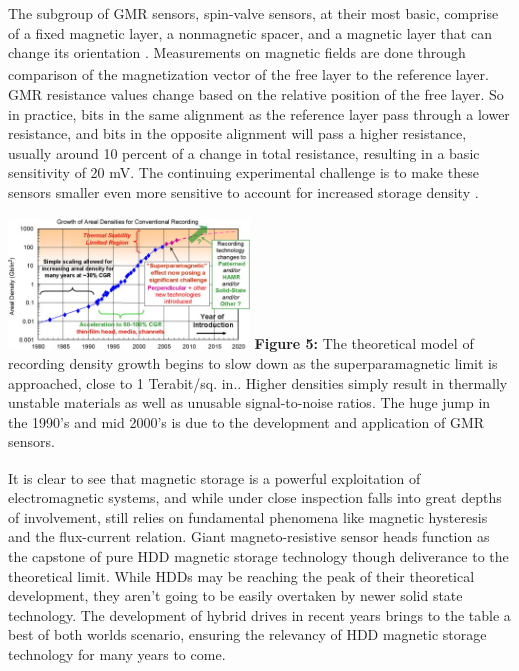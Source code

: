 \documentclass[11pt]{article}
\begin{document}
\begin{multicols}{2}
The subgroup of GMR sensors, spin-valve sensors, at their most basic, comprise of a fixed magnetic layer, a nonmagnetic spacer, and a magnetic layer that can change its orientation\textsubscript{ \cite{label3}}. Measurements on magnetic fields are done through comparison of the magnetization vector of the free layer to the reference layer. GMR resistance values change based on the relative position of the free layer. So in practice, bits in the same alignment as the reference layer pass through a lower resistance, and bits in the opposite alignment will pass a higher resistance, usually around 10 percent of a change in total resistance, resulting in a basic sensitivity of 20 mV. The continuing experimental challenge is to make these sensors smaller even more sensitive to account for increased storage density\textsubscript{ \cite{label5}}.

\begin{center}
	\centering
	\includegraphics[width=0.48\textwidth]{region_of_stability.png}
	{\footnotesize\textbf{Figure 5:} The theoretical model of recording density growth begins to slow down as the superparamagnetic limit is approached, close to 1 Terabit/sq. in.. Higher densities simply result in thermally unstable materials as well as unusable signal-to-noise ratios. The huge jump in the 1990’s and mid 2000’s is due to the development and application of GMR sensors.\textsubscript{\cite{label6}}} 
\end{center} 

It is clear to see that magnetic storage is a powerful exploitation of electromagnetic systems, and while under close inspection falls into great depths of involvement, still relies on fundamental phenomena like magnetic hysteresis and the flux-current relation. Giant magneto-resistive sensor heads function as the capstone of pure HDD magnetic storage technology though deliverance to the theoretical limit. While HDDs may be reaching the peak of their theoretical development, they aren't going to be easily overtaken by newer solid state technology. The development of hybrid drives in recent years brings to the table a best of both worlds scenario, ensuring the relevancy of HDD magnetic storage technology for many years to come.



\end{multicols}
\end{document}

